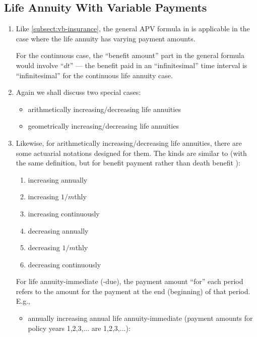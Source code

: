 \subsection{Life Annuity With Variable Payments}
\begin{enumerate}
\item Like \cref{subsect:vb-insurance}, the general APV formula in
 is applicable in the case where the life annuity
has varying payment amounts. \begin{note}
For the continuous case, the ``benefit amount'' part in the general formula
would involve ``\(dt\)'' --- the benefit paid in an ``infinitesimal'' time interval
is ``infinitesimal'' for the continuous life annuity case.
\end{note}
\item Again we shall discuss two special cases:
\begin{itemize}
\item arithmetically increasing/decreasing life annuities
\item geometrically increasing/decreasing life annuities
\end{itemize}

\item Likewise, for arithmetically increasing/decreasing life annuities, there
are some actuarial notations designed for them. The kinds are similar to
 (with the same definition, but for benefit
payment  rather than death benefit
):
\begin{enumerate}
\item increasing annually
\item increasing \(1/m\)thly
\item increasing continuously
\item decreasing annually
\item decreasing \(1/m\)thly
\item decreasing continuously
\end{enumerate}

\begin{note}
For life annuity-immediate (-due), the payment amount ``for'' each period
refers to the amount for the payment at the end (beginning) of that period.
E.g.,
\begin{itemize}
\item annually increasing annual life annuity-immediate
(payment amounts for policy years 1,2,3,... are 1,2,3,...):


\end{itemize}
\end{note}
\end{enumerate}
